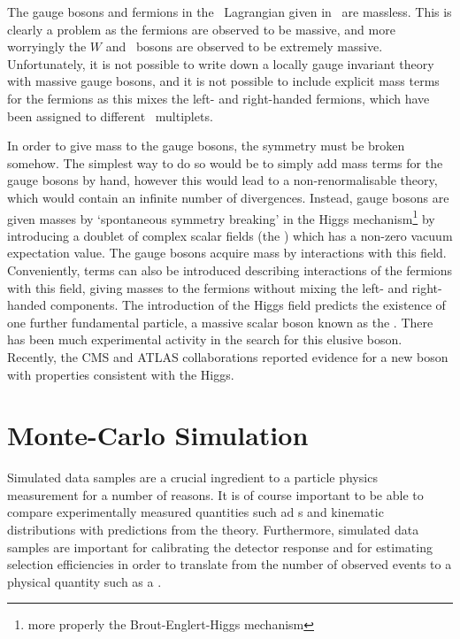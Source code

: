 The gauge bosons and fermions in the \ew\ Lagrangian given
in~ are massless. This is clearly a problem as the fermions
are observed to be massive, and more worryingly the $W$ and \Z\ bosons are
observed to be extremely massive. Unfortunately, it is not possible to write down a locally gauge invariant theory with massive
gauge bosons, and it is not possible to include explicit mass terms for the
fermions as this mixes the left- and right-handed fermions, which have been
assigned to different \sutwo\ multiplets. 

In order to give
mass to the gauge bosons, the symmetry must be broken somehow. The simplest way
to do so would be to simply add mass terms for the gauge bosons by hand, however
this would lead to a non-renormalisable theory, which would contain an infinite
number of divergences. Instead, gauge bosons are given masses by `spontaneous
symmetry breaking' in the Higgs mechanism\footnote{more properly the Brout-Englert-Higgs
mechanism} by introducing a doublet of complex scalar fields (the ) which has a non-zero vacuum expectation value. The gauge bosons acquire
mass by interactions with this field. Conveniently, terms can also be
introduced describing interactions of the fermions with this field, giving
masses to the fermions without mixing the left- and right-handed components. The
introduction of the Higgs field predicts the existence of one further
fundamental particle, a massive scalar boson known as the . There has
been much experimental activity in the search for this elusive boson. Recently,
the CMS and ATLAS collaborations reported evidence for a new boson with
properties consistent with the Higgs.

\section{Monte-Carlo Simulation}
\label{sec:Theory-MC}

Simulated data samples are a crucial ingredient to a particle physics
measurement for a number of reasons. It is of course important to be able to
compare experimentally measured quantities such ad \cx s and kinematic
distributions with predictions from the theory. Furthermore, simulated data
samples are important for calibrating the detector response and for estimating
selection efficiencies in order to translate from the number of observed events
to a physical quantity such as a \cx. 

